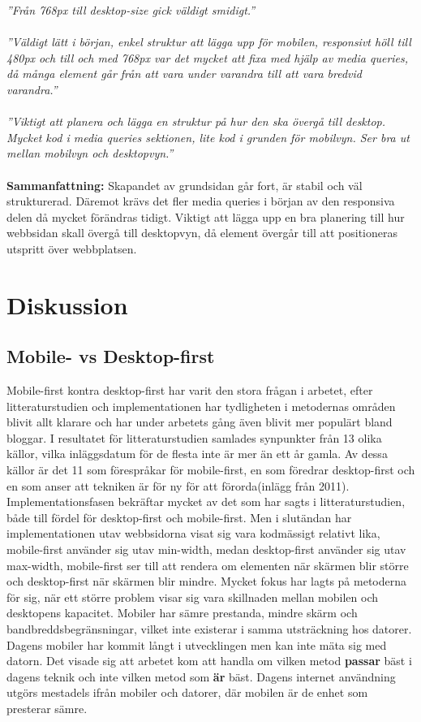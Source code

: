 \documentclass[11pt]{article}
\begin{document}
\textit{”Från 768px till desktop-size gick väldigt smidigt.”}\\\\
\textit{”Väldigt lätt i början, enkel struktur att lägga upp för mobilen, responsivt höll till 480px och till och med 768px var det mycket att fixa med hjälp av media queries, då många element går från att vara under varandra till att vara bredvid varandra.”}\\\\
\textit{”Viktigt att planera och lägga en struktur på hur den ska övergå till desktop. Mycket kod i media queries sektionen, lite kod i grunden för mobilvyn.  Ser bra ut mellan mobilvyn och desktopvyn.”}\\\\
\textbf{Sammanfattning:} Skapandet av grundsidan går fort, är stabil och väl strukturerad. Däremot krävs det fler media queries i början av den responsiva delen då mycket förändras tidigt. Viktigt att lägga upp en bra planering till hur webbsidan skall övergå till desktopvyn, då element övergår till att positioneras utspritt över webbplatsen.



\section{Diskussion}
\subsection{Mobile- vs Desktop-first}
Mobile-first kontra desktop-first har varit den stora frågan i arbetet, efter litteraturstudien och implementationen har tydligheten i metodernas områden blivit allt klarare och har under arbetets gång även blivit mer populärt bland bloggar. I resultatet för litteraturstudien samlades synpunkter från 13 olika källor, vilka inläggsdatum för de flesta inte är mer än ett år gamla. Av dessa källor är det 11 som förespråkar för mobile-first, en som föredrar desktop-first och en som anser att tekniken är för ny för att förorda(inlägg från 2011). Implementationsfasen bekräftar mycket av det som har sagts i litteraturstudien, både till fördel för desktop-first och mobile-first. Men i slutändan har implementationen utav webbsidorna visat sig vara kodmässigt relativt lika, mobile-first använder sig utav min-width, medan desktop-first använder sig utav max-width, mobile-first ser till att rendera om elementen när skärmen blir större och desktop-first när skärmen blir mindre.
Mycket fokus har lagts på metoderna för sig, när ett större problem visar sig vara skillnaden mellan mobilen och desktopens kapacitet. Mobiler har sämre prestanda, mindre skärm och bandbreddsbegränsningar, vilket inte existerar i samma utsträckning hos datorer. Dagens mobiler har kommit långt i utvecklingen men kan inte mäta sig med datorn.
Det visade sig att arbetet kom att handla om vilken metod \textbf{passar} bäst i dagens teknik och inte vilken metod som \textbf{är} bäst. Dagens internet användning utgörs mestadels ifrån mobiler och datorer, där mobilen är de enhet som presterar sämre. 
\end{document}
